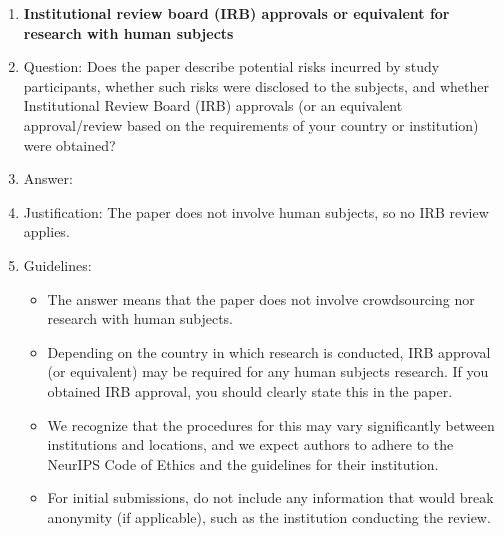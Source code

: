 \begin{enumerate}
\item {\bf Institutional review board (IRB) approvals or equivalent for research with human subjects}
    \item[] Question: Does the paper describe potential risks incurred by study participants, whether such risks were disclosed to the subjects, and whether Institutional Review Board (IRB) approvals (or an equivalent approval/review based on the requirements of your country or institution) were obtained?
    \item[] Answer: \answerNA{}
    \item[] Justification: The paper does not involve human subjects, so no IRB review applies.
    \item[] Guidelines:
    \begin{itemize}
        \item The answer \answerNA{} means that the paper does not involve crowdsourcing nor research with human subjects.
        \item Depending on the country in which research is conducted, IRB approval (or equivalent) may be required for any human subjects research. If you obtained IRB approval, you should clearly state this in the paper. 
        \item We recognize that the procedures for this may vary significantly between institutions and locations, and we expect authors to adhere to the NeurIPS Code of Ethics and the guidelines for their institution. 
        \item For initial submissions, do not include any information that would break anonymity (if applicable), such as the institution conducting the review.
    \end{itemize}


\end{enumerate}
